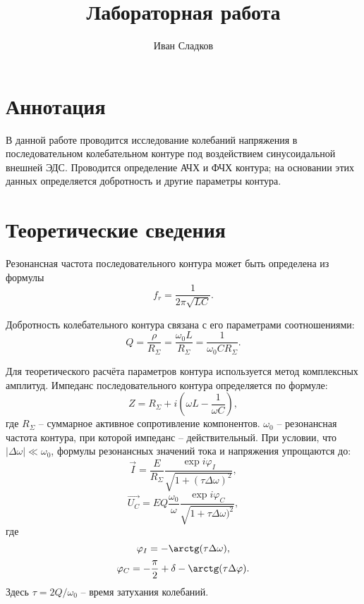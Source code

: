 \documentclass[a4paper]{article}
\title{Лабораторная работа \labnum \space \labname} %
\author{Иван Сладков}
\begin{document}
\maketitle
\thispagestyle{empty}
\section{Аннотация}
В данной работе проводится исследование колебаний напряжения в последовательном колебательном контуре под воздействием синусоидальной внешней ЭДС. Проводится определение АЧХ и ФЧХ контура; на основании этих данных определяется добротность и другие параметры контура. 

\section{Теоретические сведения}

Резонансная частота последовательного контура может быть определена из формулы
\begin{equation}\label{freq}
	f_r = \frac{1}{2 \pi \sqrt{L C}}.
\end{equation}

Добротность колебательного контура связана с его параметрами соотношениями:
\begin{equation}\label{qual}
	Q = \frac{\rho}{R_\Sigma} = \frac{\omega_0 L}{R_\Sigma} = \frac{1}{\omega_0 C R_\Sigma}.
\end{equation}

Для теоретического расчёта параметров контура используется метод комплексных амплитуд. Импеданс последовательного контура определяется по формуле:
\begin{equation}\label{импеданс}
	Z = R_\Sigma +i(\omega L - \frac{1}{\omega C}),
\end{equation}
где $ R_\Sigma $ -- суммарное активное сопротивление компонентов. $ \omega_0 $ -- резонансная частота контура, при которой импеданс -- действительный. При условии, что $ | \Delta \omega | \ll \omega_0 $, формулы резонансных значений тока и напряжения упрощаются до:
\begin{equation}\label{Ires}
	\overrightarrow{I} = \frac{E}{R_\Sigma} \frac{\exp i\varphi_I}{\sqrt{1+(\tau \Delta \omega )^2}}, 
\end{equation}
\begin{equation}\label{Ures}
	\overrightarrow{U_C} = E Q \frac{\omega_0}{\omega} \frac{\exp i \varphi_C}{\sqrt{1+\tau \Delta \omega )^2}},
\end{equation}
где 
\begin{equation*}
	\varphi_I = -\arctg (\tau \Delta \omega ), 
\end{equation*}
\begin{equation}\label{phi_c}
	\varphi_C = -\frac{\pi}{2} + \delta - \arctg (\tau \Delta \varphi ).
\end{equation}
Здесь $ \tau = 2 Q / \omega_0 $ -- время затухания колебаний.
\end{document}
